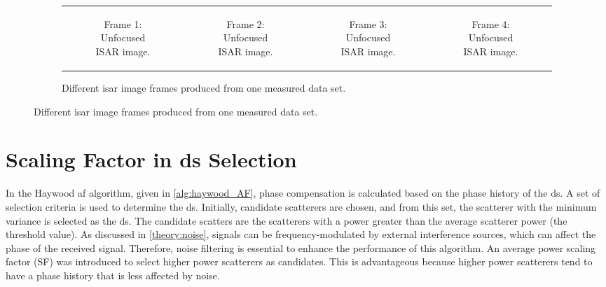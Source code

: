 \documentclass[class=report,11pt,crop=false]{standalone}
\begin{document}
\begin{figure}[h]
\begin{minipage}{0.9\linewidth}
\begin{figure}
\begin{tabular}{@{}cccc@{}}
\begin{subfigure}{0.25\linewidth}
                        \centering
                        \resizebox{\linewidth}{!}{}
                        \caption{Frame 1: Unfocused ISAR image.}
                    \end{subfigure}
                    &
                    \begin{subfigure}{0.25\linewidth}
                        \centering
                        \resizebox{\linewidth}{!}{}
                        \caption{Frame 2: Unfocused ISAR image.}
                    \end{subfigure}
                    &
                    \begin{subfigure}{0.25\linewidth}
                        \centering
                        \resizebox{\linewidth}{!}{}
                         \caption{Frame 3: Unfocused ISAR image.}
                    \end{subfigure}
                    &
                    \begin{subfigure}{0.25\linewidth}
                        \centering
                        \resizebox{\linewidth}{!}{}
                         \caption{Frame 4: Unfocused ISAR image.}
                    \end{subfigure}
                \end{tabular}
                \caption{Different \gls{isar} image frames produced from one measured data set. \label{fig:measured_data_frames}}
            \end{figure}
        \end{minipage}
    \end{figure}

\section{Scaling Factor in \gls{ds} Selection \label{apndxA:scale_factor_effect}}
In the Haywood \gls{af} algorithm, given in \autoref{alg:haywood_AF}, phase compensation is calculated based on the phase history of the \gls{ds}. A set of selection criteria is used to determine the \gls{ds}. Initially, candidate scatterers are chosen, and from this set, the scatterer with the minimum variance is selected as the \gls{ds}. The candidate scatters are the scatterers with a power greater than the average scatterer power (the threshold value). As discussed in \autoref{theory:noise}, signals can be frequency-modulated by external interference sources, which can affect the phase of the received signal. Therefore, noise filtering is essential to enhance the performance of this algorithm. An average power scaling factor (SF) was introduced to select higher power scatterers as candidates. This is advantageous because higher power scatterers tend to have a phase history that is less affected by noise.
\end{document}
